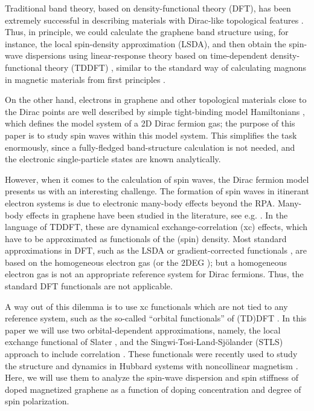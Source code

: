 \documentclass[aps,prb,twocolumn,superscriptaddress]{revtex4-2}
\begin{document}
Traditional band theory, based on density-functional theory (DFT), has been extremely successful in describing materials with Dirac-like topological
features \cite{Bansil2016}. Thus, in principle, we could calculate the graphene band structure using, for instance, the local spin-density approximation (LSDA),
and then obtain the spin-wave dispersions using linear-response theory based on time-dependent density-functional theory (TDDFT) \cite{Ullrich2012}, similar to the standard way of calculating magnons in magnetic materials from first principles \cite{Savrasov1998,Buczek2009,Zakeri2014}.

On the other hand, electrons in graphene and other topological materials close to the Dirac points are well described by simple tight-binding model Hamiltonians
\cite{Neto2009,Shen}, which defines the model system of a 2D Dirac fermion gas; the purpose of this paper is to study spin waves
within this model system. This simplifies the task enormously, since a fully-fledged band-structure calculation is not needed, and the
electronic single-particle states are known analytically.

However, when it comes to the calculation of spin waves, the Dirac fermion model presents us with an interesting challenge. The formation of
spin waves in itinerant electron systems is due to electronic many-body effects beyond the RPA. Many-body effects in graphene have been
studied in the literature, see e.g. \cite{Kotov2012,Sodemann2012}. In the language of TDDFT,
these are dynamical exchange-correlation (xc) effects, which have to be approximated as functionals of the (spin) density.
Most standard approximations in DFT, such as the LSDA or gradient-corrected functionals \cite{Perdew1996}, are based on the homogeneous electron gas
(or the 2DEG \cite{Ullrich2002,Rasanen2010}); but a homogeneous electron gas is not an appropriate reference system for Dirac fermions. Thus, the standard DFT
functionals are not applicable.

A way out of this dilemma is to use xc functionals which are not tied to any reference system, such as the so-called
``orbital functionals'' of (TD)DFT \cite{Kummel2008}. In this paper we will use two orbital-dependent approximations, namely, the local
exchange functional of Slater \cite{Slater1951}, and the Singwi-Tosi-Land-Sj{\"o}lander (STLS) approach to include correlation \cite{Singwi1968,GiulianiVignale}.
These functionals were recently used to study the structure and dynamics in Hubbard systems with noncollinear magnetism \cite{Ullrich2018,Pluhar2019}.
Here, we will use them to analyze the spin-wave dispersion and spin stiffness of doped magnetized graphene as a function of doping concentration and
degree of spin polarization.
\end{document}
